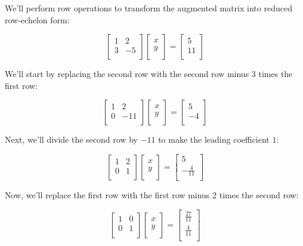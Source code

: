 \documentclass[handout]{ximera}
\begin{document}
We'll perform row operations to transform the augmented matrix into reduced row-echelon form:

\[
\begin{bmatrix}
1 & 2 \\
3 & -5 \\
\end{bmatrix}
\begin{bmatrix}
x \\
y \\
\end{bmatrix}
=
\begin{bmatrix}
5 \\
11 \\
\end{bmatrix}
\]

We'll start by replacing the second row with the second row minus 3 times the first row:

\[
\begin{bmatrix}
1 & 2 \\
0 & -11 \\
\end{bmatrix}
\begin{bmatrix}
x \\
y \\
\end{bmatrix}
=
\begin{bmatrix}
5 \\
-4 \\
\end{bmatrix}
\]

Next, we'll divide the second row by $-11$ to make the leading coefficient $1$:

\[
\begin{bmatrix}
1 & 2 \\
0 & 1 \\
\end{bmatrix}
\begin{bmatrix}
x \\
y \\
\end{bmatrix}
=
\begin{bmatrix}
5 \\
-\frac{4}{11} \\
\end{bmatrix}
\]

Now, we'll replace the first row with the first row minus 2 times the second row:

\[
\begin{bmatrix}
1 & 0 \\
0 & 1 \\
\end{bmatrix}
\begin{bmatrix}
x \\
y \\
\end{bmatrix}
=
\begin{bmatrix}
\frac{27}{11} \\
\frac{4}{11} \\
\end{bmatrix}
\]
\end{document}
